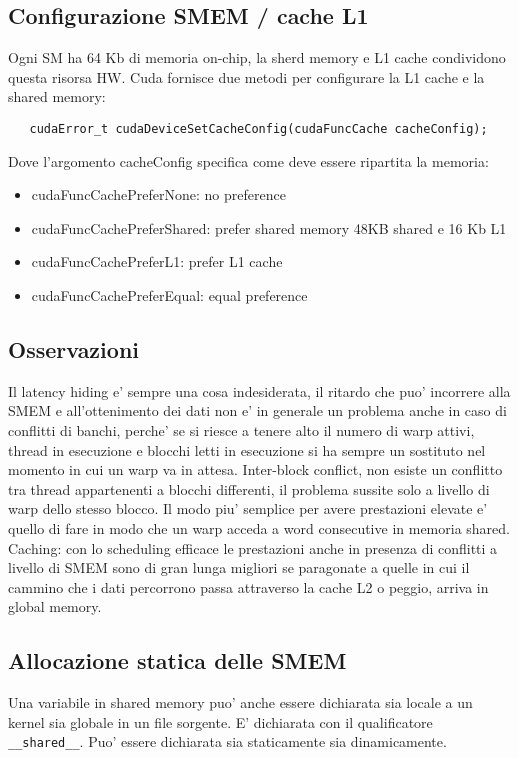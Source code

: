 
\subsection{Configurazione SMEM / cache L1}
Ogni SM ha 64 Kb di memoria on-chip, la sherd memory e L1 cache condividono questa risorsa HW. 
Cuda fornisce due metodi per configurare la L1 cache e la shared memory:
\begin{lstlisting}
   cudaError_t cudaDeviceSetCacheConfig(cudaFuncCache cacheConfig);
\end{lstlisting}

Dove l'argomento cacheConfig specifica come deve essere ripartita la memoria:
\begin{itemize}
    \item cudaFuncCachePreferNone: no preference
    \item cudaFuncCachePreferShared: prefer shared memory 48KB shared e 16 Kb L1
    \item cudaFuncCachePreferL1: prefer L1 cache
    \item cudaFuncCachePreferEqual: equal preference
\end{itemize}

\subsection{Osservazioni}
Il latency hiding e' sempre una cosa indesiderata, il ritardo che puo' incorrere alla SMEM e all'ottenimento dei dati non e' in generale un problema anche in caso di conflitti di banchi, perche' se si riesce a tenere alto il numero di warp attivi, thread in esecuzione e blocchi letti in esecuzione si ha sempre un sostituto nel momento in cui un warp va in attesa.
Inter-block conflict, non esiste un conflitto tra thread appartenenti a blocchi differenti, il problema sussite solo a livello di warp dello stesso blocco.
Il modo piu' semplice per avere prestazioni elevate e' quello di fare in modo che un warp acceda a word consecutive in memoria shared.
Caching: con lo scheduling efficace le prestazioni anche in presenza di conflitti a livello di SMEM sono di gran lunga migliori se paragonate a quelle in cui il cammino che i dati percorrono passa attraverso la cache L2 o peggio, arriva in global memory.

\subsection{Allocazione statica delle SMEM}
Una variabile in shared memory puo' anche essere dichiarata sia locale a un kernel sia globale in un file sorgente.
E' dichiarata con il qualificatore \texttt{\_\_shared\_\_}.
Puo' essere dichiarata sia staticamente sia dinamicamente.

